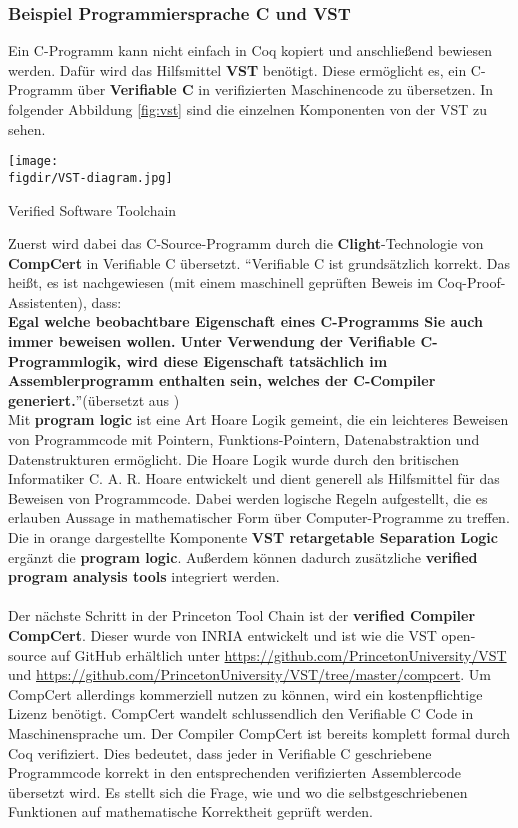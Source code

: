 \subsubsection{Beispiel Programmiersprache C und VST}
Ein C-Programm kann nicht einfach in Coq kopiert und anschließend bewiesen werden. Dafür wird das Hilfsmittel \textbf{VST} benötigt. Diese ermöglicht es, ein C-Programm über \textbf{Verifiable C} in verifizierten Maschinencode zu übersetzen.
In folgender Abbildung \ref{fig:vst} sind die einzelnen Komponenten von der VST zu sehen.

\begin{minipage}{\textwidth}
	\centering
	\captionsetup{type=figure}
	\texttt{[image: \\figdir/VST-diagram.jpg]}
	\caption{Verified Software Toolchain\cite{PRINCETON01:VST}}
	\label{fig:vst}
\end{minipage}

Zuerst wird dabei das C-Source-Programm durch die \textbf{Clight}-Technologie von \textbf{CompCert} in Verifiable C übersetzt.
"`Verifiable C ist grundsätzlich korrekt. Das heißt, es ist nachgewiesen (mit einem maschinell geprüften Beweis im Coq-Proof-Assistenten), dass:\\
\textbf{Egal welche beobachtbare Eigenschaft eines C-Programms Sie auch immer beweisen wollen. Unter Verwendung der Verifiable C-Programmlogik, wird diese Eigenschaft
tatsächlich im Assemblerprogramm enthalten sein, welches der C-Compiler generiert.}"'(übersetzt aus \cite{Appel02:VST})\\
Mit \textbf{program logic} ist eine Art Hoare Logik gemeint, die ein leichteres Beweisen von Programmcode mit Pointern, Funktions-Pointern, Datenabstraktion und Datenstrukturen ermöglicht.\cite{Appel02:VST} Die Hoare Logik wurde durch den britischen Informatiker C. A. R. Hoare entwickelt und dient generell als Hilfsmittel für das Beweisen von Programmcode. Dabei werden logische Regeln aufgestellt, die es erlauben Aussage in mathematischer Form über Computer-Programme zu treffen.\\
Die in orange dargestellte Komponente \textbf{VST retargetable Separation Logic} ergänzt die \textbf{program logic}. Außerdem können dadurch zusätzliche \textbf{verified program analysis tools} integriert werden.\\
\\
Der nächste Schritt in der Princeton Tool Chain ist der \textbf{verified Compiler CompCert}. Dieser wurde von INRIA entwickelt und ist wie die VST open-source auf GitHub erhältlich unter \url{https://github.com/PrincetonUniversity/VST} und \url{https://github.com/PrincetonUniversity/VST/tree/master/compcert}. Um CompCert allerdings kommerziell nutzen zu können, wird ein kostenpflichtige Lizenz benötigt.
CompCert wandelt schlussendlich den Verifiable C Code in Maschinensprache um.
Der Compiler CompCert ist bereits komplett formal durch Coq verifiziert. Dies bedeutet, dass jeder in Verifiable C geschriebene Programmcode korrekt in den entsprechenden verifizierten Assemblercode übersetzt wird. Es stellt sich die Frage, wie und wo die selbstgeschriebenen Funktionen auf mathematische Korrektheit geprüft werden.

